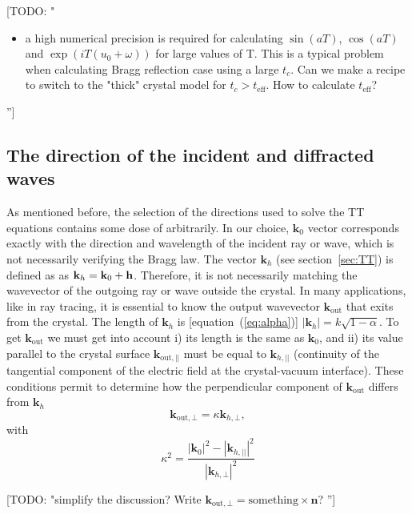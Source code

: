 \documentclass[preprint]{iucr}              %
\newcommand{\todo}[1]{{\color{red}[TODO: "#1'']}}
\newcommand{\inblue}[1]{{\color{blue}#1}}
\begin{document}
\todo{
\begin{itemize}
    \item a high numerical precision is required for calculating $\sin(aT)$, $\cos(aT)$ and $\exp(iT(u_0+\omega))$ for large values of T. This is  a typical problem when calculating Bragg reflection case using a large $t_c$. Can we make a recipe to switch to the "thick" crystal model for $t_c>t_{\text{eff}}$. How to calculate $t_{\text{eff}}$? 
\end{itemize}
}
\inblue{
\subsection{The direction of the incident and diffracted waves}\label{sec:directions}
}
\inblue{
As mentioned before, the selection of the directions used to solve the TT equations contains some dose of arbitrarily. In our choice, $\textbf{k}_0$ vector corresponds exactly with the direction and wavelength of the incident ray or wave, which is not necessarily verifying the Bragg law.
The vector $\textbf{k}_h$ (see section~\ref{sec:TT}) is defined as as $\textbf k_h=\textbf k_0 + \textbf h$. Therefore, it is not necessarily matching the wavevector of the outgoing ray or wave outside the crystal.
In many applications, like in ray tracing, it is essential to know the output wavevector $\textbf{k}_{\text{out}}$ that exits from the crystal. The length of $\textbf{k}_h$ is [equation~(\ref{eq:alpha})] $|\textbf{k}_h|=k\sqrt{1-\alpha}$.
To get $\textbf{k}_{\text{out}}$ we must get into account i) its length is the same as $\textbf{k}_0$, and ii) its value parallel to the crystal surface $\textbf{k}_{\text{out}, ||}$ must be equal to $\textbf{k}_{h,||}$ (continuity of the tangential component of the electric field at the crystal-vacuum interface).
These conditions permit to determine how the perpendicular component of $\textbf{k}_{\text{out}}$ differs from $\textbf{k}_h$
\begin{equation}
    \textbf{k}_{\text{out}, \bot} = \kappa \textbf{k}_{h,\bot},
\end{equation}
with 
\begin{equation}
    \kappa^2 = \frac{|\textbf{k}_0|^2-|\textbf{k}_{h,||}|^2}
    {|\textbf{k}_{h,\bot}|^2}
\end{equation}
}

\todo{simplify the discussion? Write $\textbf{k}_{\text{out}, \bot} = \text{something} \times \textbf{n}$? }
\end{document}
